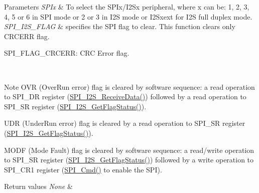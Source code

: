 \begin{DoxyParams}{Parameters}
{\em S\+P\+Ix} & To select the S\+P\+Ix/\+I2\+Sx peripheral, where x can be\+: 1, 2, 3, 4, 5 or 6 in S\+PI mode or 2 or 3 in I2S mode or I2\+Sxext for I2S full duplex mode. \\
\hline
{\em S\+P\+I\+\_\+\+I2\+S\+\_\+\+F\+L\+AG} & specifies the S\+PI flag to clear. This function clears only C\+R\+C\+E\+RR flag. \begin{DoxyItemize}
\item S\+P\+I\+\_\+\+F\+L\+A\+G\+\_\+\+C\+R\+C\+E\+RR\+: C\+RC Error flag. ~\newline
 \end{DoxyItemize}
\\
\hline
\end{DoxyParams}
\begin{DoxyNote}{Note}
O\+VR (Over\+Run error) flag is cleared by software sequence\+: a read operation to S\+P\+I\+\_\+\+DR register (\mbox{\hyperlink{group___s_p_i___group2_gab77de76547f3bff403236b263b070a30}{S\+P\+I\+\_\+\+I2\+S\+\_\+\+Receive\+Data()}}) followed by a read operation to S\+P\+I\+\_\+\+SR register (\mbox{\hyperlink{group___s_p_i___group5_ga1bd785d129e09c5734a876c8f2767204}{S\+P\+I\+\_\+\+I2\+S\+\_\+\+Get\+Flag\+Status()}}). 

U\+DR (Under\+Run error) flag is cleared by a read operation to S\+P\+I\+\_\+\+SR register (\mbox{\hyperlink{group___s_p_i___group5_ga1bd785d129e09c5734a876c8f2767204}{S\+P\+I\+\_\+\+I2\+S\+\_\+\+Get\+Flag\+Status()}}). ~\newline


M\+O\+DF (Mode Fault) flag is cleared by software sequence\+: a read/write operation to S\+P\+I\+\_\+\+SR register (\mbox{\hyperlink{group___s_p_i___group5_ga1bd785d129e09c5734a876c8f2767204}{S\+P\+I\+\_\+\+I2\+S\+\_\+\+Get\+Flag\+Status()}}) followed by a write operation to S\+P\+I\+\_\+\+C\+R1 register (\mbox{\hyperlink{group___s_p_i___group1_gaa31357879a65ee1ed7223f3b9114dcf3}{S\+P\+I\+\_\+\+Cmd()}} to enable the S\+PI).
\end{DoxyNote}

\begin{DoxyRetVals}{Return values}
{\em None} & \\
\hline
\end{DoxyRetVals}
\mbox{\label{group___s_p_i_ga35a524a49ff3d058137060f751e8749f}} 
